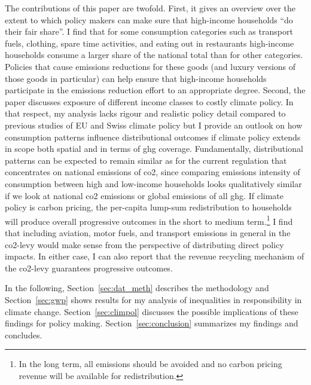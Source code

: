 \documentclass[a4paper,11pt,abstract=true]{scrartcl}
\begin{document}
The contributions of this paper are twofold.
First, it gives an overview over the extent to which policy makers can make sure that high-income households ``do their fair share''.
I find that for some consumption categories such as transport fuels, clothing, spare time activities, and eating out in restaurants high-income households consume a larger share of the national total than for other categories.
Policies that cause emissions reductions for these goods (and luxury versions of those goods in particular) can help ensure that high-income households participate in the emissions reduction effort to an appropriate degree.
Second, the paper discusses exposure of different income classes to costly climate policy.
In that respect, my analysis lacks rigour and realistic policy detail compared to previous studies of EU and Swiss climate policy \citep[e.g.,][]{landis_efficient_2019, landis_between-_2021} but I provide an outlook on how consumption patterns influence distributional outcomes if climate policy extends in scope both spatial and in terms of \ac{ghg} coverage.
Fundamentally, distributional patterns can be expected to remain similar as for the current regulation that concentrates on national emissions of \ac{co2}, since comparing emissions intensity of consumption between high and low-income households looks qualitatively similar if we look at national \ac{co2} emissions or global emissions of all \acs{ghg}.
If climate policy is carbon pricing, the per-capita lump-sum redistribution to households will produce overall progressive outcomes in the short  to medium term.\footnote{%
  In the long term, all emissions should be avoided and no carbon pricing revenue will be available for redistribution.
}
I find that including aviation, motor fuels, and transport emissions in general in the \ac{co2}-levy would make sense from the perspective of distributing direct policy impacts.
In either case, I can also report that the revenue recycling mechanism of the \ac{co2}-levy guarantees progressive outcomes.

In the following, Section~\ref{sec:dat_meth} describes the methodology and Section~\ref{sec:gwp} shows results for my analysis of inequalities in responsibility in climate change.
Section~\ref{sec:climpol} discusses the possible implications of these findings for policy making.
Section~\ref{sec:conclusion} summarizes my findings and concludes.
\clearpage
\end{document}
